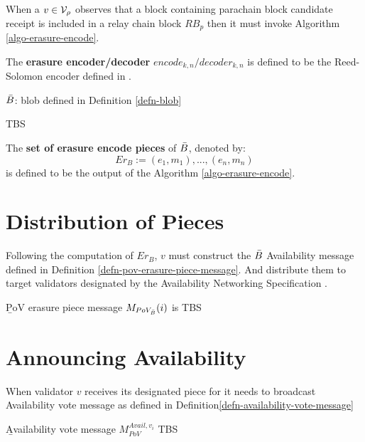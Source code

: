 When a $v \in \mathcal{V}_\rho$ observes that a block containing parachain block candidate receipt is included in a relay chain block $RB_p$ then it must invoke Algorithm \ref{algo-erasure-encode}.

\begin{definition}
  \label{defn-erasure-encoder-decoder}
  The {\bf erasure encoder/decoder} {\bf $encode_{k,n}/decoder_{k,n}$ } is defined to be the Reed-Solomon encoder defined in \cite{??}.
\end{definition}

\begin{algorithm}
  \caption[]{\sc Erasure-Encode($\blobB$, $n$}
  \label{algo-erasure-encode}
  \begin{algorithmic}[1]
  \Require
    $\blobB$: blob defined in Definition \ref{defn-blob}

    \State TBS
  \end{algorithmic}
\end{algorithm}

\begin{definition}
  \label{defn-erasure-coded-pieces}
  The {\bf set of erasure encode pieces} of $\blobB$, denoted by:
  \[
   Er_B := {(e_1, m_1),...,(e_n,m_n)}
   \]
   is defined to be the output of the Algorithm \ref{algo-erasure-encode}.
\end{definition}

\section{Distribution of Pieces}\label{sect-distribute-pieces}
Following the computation of $Er_B$, $v$ must construct the $\blobB$ Availability message defined in Definition \ref{defn-pov-erasure-piece-message}. And distribute them to target validators designated by the Availability Networking Specification \cite{??}.

\begin{definition}
  \label{defn-pov-erasure-piece-message}
        {\b PoV erasure piece message} $M_{PoV_{\bar{B}}}(i)$ is TBS
\end{definition}

\section{Announcing Availability}\label{sect-voting-on-availability}

When validator $v$ receives its designated piece for \blobB it needs to broadcast Availability vote message as defined in Definition\ref{defn-availability-vote-message}
\begin{definition}
  \label{defn-availability-vote-message}
        {\b Availability vote message} $M_{PoV}^{Avail,v_i}$ TBS
\end{definition}

